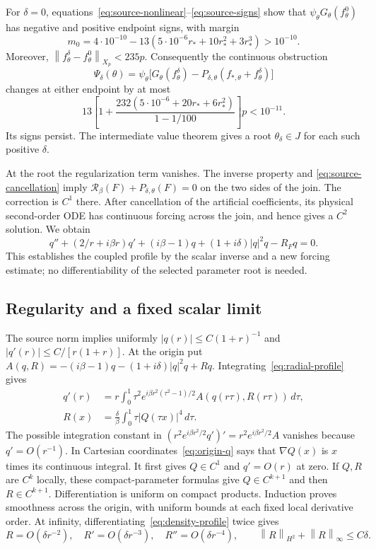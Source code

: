 \documentclass[11pt]{article}
\numberwithin{equation}{section}
\theoremstyle{remark}
\newcommand{\norm}[1]{\left\|#1\right\|}
\begin{document}
For $\delta=0$, equations~\eqref{eq:source-nonlinear}--\eqref{eq:source-signs}
show that $\psi_\theta G_\theta(f_\theta^0)$ has negative and positive
endpoint signs, with margin
\[
 m_0=4\cdot10^{-10}
       -13(5\cdot10^{-6}r_*+10r_*^2+3r_*^3)>10^{-10}.
\]
Moreover, $\norm{f_\theta^\delta-f_\theta^0}_{X_p}<235p$.
Consequently the continuous obstruction
\[
 \Psi_\delta(\theta)=\psi_\theta\bigl[G_\theta(f_\theta^\delta)
       -P_{\delta,\theta}(f_{*,\theta}+f_\theta^\delta)\bigr]
\]
changes at either endpoint by at most
\[
 13\left[1+
 \frac{232(5\cdot10^{-6}+20r_*+6r_*^2)}{1-1/100}\right]p<10^{-11}.
\]
Its signs persist. The intermediate value theorem gives a root
$\theta_\delta\in J$ for each such positive $\delta$.

At the root the regularization term vanishes. The inverse property and
\eqref{eq:source-cancellation} imply
$\mathcal R_\beta(F)+P_{\delta,\theta}(F)=0$ on the two sides of the join.
The correction is $C^1$ there. After cancellation of the artificial
coefficients, its physical second-order ODE has continuous forcing across
the join, and hence gives a $C^2$ solution. We obtain
\begin{equation}\label{eq:radial-profile}
 q''+(2/r+i\beta r)q'+(i\beta-1)q
          +(1+i\delta)|q|^2q-R_Fq=0.
\end{equation}
This establishes the coupled profile by the scalar inverse and a new
forcing estimate; no differentiability of the selected parameter root is
needed.

\subsection{Regularity and a fixed scalar limit}\label{subsec:profile-limit}

The source norm implies uniformly
$|q(r)|\le C(1+r)^{-1}$ and $|q'(r)|\le C/[r(1+r)]$.
At the origin put
$A(q,R)=-(i\beta-1)q-(1+i\delta)|q|^2q+Rq$.
Integrating~\eqref{eq:radial-profile} gives
\begin{align}
 q'(r)&=r\int_0^1\tau^2 e^{i\beta r^2(\tau^2-1)/2}
            A(q(r\tau),R(r\tau))\,d\tau,\label{eq:origin-q}\\
 R(x)&=\frac{\delta}{\beta}\int_0^1\tau|Q(\tau x)|^4\,d\tau.
 \label{eq:origin-R}
\end{align}
The possible integration constant in
$(r^2e^{i\beta r^2/2}q')'=r^2e^{i\beta r^2/2}A$ vanishes because
$q'=O(r^{-1})$. In Cartesian coordinates~\eqref{eq:origin-q} says
that $\nabla Q(x)$ is $x$ times its continuous integral. It first gives
$Q\in C^1$ and $q'=O(r)$ at zero. If $Q,R$ are $C^k$ locally, these
compact-parameter formulas give $Q\in C^{k+1}$ and then $R\in C^{k+1}$.
Differentiation is uniform on compact products. Induction proves smoothness
across the origin, with uniform bounds at each fixed local derivative order.
At infinity, differentiating~\eqref{eq:density-profile} twice gives
\begin{equation}\label{eq:R-tail}
 R=O(\delta r^{-2}),\quad R'=O(\delta r^{-3}),\quad
 R''=O(\delta r^{-4}),\qquad
 \norm R_{H^2}+\norm R_\infty\le C\delta.
\end{equation}
\end{document}
